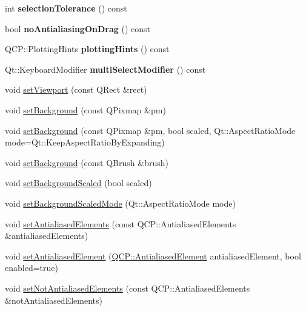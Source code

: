 \begin{DoxyCompactItemize}
int {\bfseries selection\+Tolerance} () const
\item 
\mbox{\label{class_q_custom_plot_aca3f01f903fb250a3dd27104d92830be}} 
bool {\bfseries no\+Antialiasing\+On\+Drag} () const
\item 
\mbox{\label{class_q_custom_plot_ac724f4075822f74f7b676a790095b877}} 
Q\+C\+P\+::\+Plotting\+Hints {\bfseries plotting\+Hints} () const
\item 
\mbox{\label{class_q_custom_plot_a28182402ed11609c9a429f0788162d18}} 
Qt\+::\+Keyboard\+Modifier {\bfseries multi\+Select\+Modifier} () const
\item 
void \mbox{\hyperlink{class_q_custom_plot_a3f9bc4b939dd8aaba9339fd09f273fc4}{set\+Viewport}} (const Q\+Rect \&rect)
\item 
void \mbox{\hyperlink{class_q_custom_plot_a130358592cfca353ff3cf5571b49fb00}{set\+Background}} (const Q\+Pixmap \&pm)
\item 
void \mbox{\hyperlink{class_q_custom_plot_a8513971d6aa24d8b0d6a68d45b542130}{set\+Background}} (const Q\+Pixmap \&pm, bool scaled, Qt\+::\+Aspect\+Ratio\+Mode mode=Qt\+::\+Keep\+Aspect\+Ratio\+By\+Expanding)
\item 
void \mbox{\hyperlink{class_q_custom_plot_a8ed256cf467bfa7ba1f9feaae62c3bd0}{set\+Background}} (const Q\+Brush \&brush)
\item 
void \mbox{\hyperlink{class_q_custom_plot_a36f0fa1317325dc7b7efea615ee2de1f}{set\+Background\+Scaled}} (bool scaled)
\item 
void \mbox{\hyperlink{class_q_custom_plot_a4c0eb4865b7949f62e1cb97db04a3de0}{set\+Background\+Scaled\+Mode}} (Qt\+::\+Aspect\+Ratio\+Mode mode)
\item 
void \mbox{\hyperlink{class_q_custom_plot_af6f91e5eab1be85f67c556e98c3745e8}{set\+Antialiased\+Elements}} (const Q\+C\+P\+::\+Antialiased\+Elements \&antialiased\+Elements)
\item 
void \mbox{\hyperlink{class_q_custom_plot_aeef813bcf7efab8e765f9f87ec454691}{set\+Antialiased\+Element}} (\mbox{\hyperlink{namespace_q_c_p_ae55dbe315d41fe80f29ba88100843a0c}{Q\+C\+P\+::\+Antialiased\+Element}} antialiased\+Element, bool enabled=true)
\item 
void \mbox{\hyperlink{class_q_custom_plot_ae10d685b5eabea2999fb8775ca173c24}{set\+Not\+Antialiased\+Elements}} (const Q\+C\+P\+::\+Antialiased\+Elements \&not\+Antialiased\+Elements)

\end{DoxyCompactItemize}
